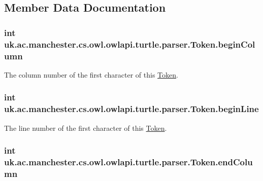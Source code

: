 \subsection{Member Data Documentation}
\hypertarget{classuk_1_1ac_1_1manchester_1_1cs_1_1owl_1_1owlapi_1_1turtle_1_1parser_1_1_token_a204c257e89ce0412166df94a2e59f745}{
\subsubsection[{begin\-Column}]{\setlength{\rightskip}{0pt plus 5cm}int uk.\-ac.\-manchester.\-cs.\-owl.\-owlapi.\-turtle.\-parser.\-Token.\-begin\-Column}}\label{classuk_1_1ac_1_1manchester_1_1cs_1_1owl_1_1owlapi_1_1turtle_1_1parser_1_1_token_a204c257e89ce0412166df94a2e59f745}
The column number of the first character of this \hyperlink{classuk_1_1ac_1_1manchester_1_1cs_1_1owl_1_1owlapi_1_1turtle_1_1parser_1_1_token}{Token}. \hypertarget{classuk_1_1ac_1_1manchester_1_1cs_1_1owl_1_1owlapi_1_1turtle_1_1parser_1_1_token_af16d327ad8503c6ab73523d31053f24e}{
\subsubsection[{begin\-Line}]{\setlength{\rightskip}{0pt plus 5cm}int uk.\-ac.\-manchester.\-cs.\-owl.\-owlapi.\-turtle.\-parser.\-Token.\-begin\-Line}}\label{classuk_1_1ac_1_1manchester_1_1cs_1_1owl_1_1owlapi_1_1turtle_1_1parser_1_1_token_af16d327ad8503c6ab73523d31053f24e}
The line number of the first character of this \hyperlink{classuk_1_1ac_1_1manchester_1_1cs_1_1owl_1_1owlapi_1_1turtle_1_1parser_1_1_token}{Token}. \hypertarget{classuk_1_1ac_1_1manchester_1_1cs_1_1owl_1_1owlapi_1_1turtle_1_1parser_1_1_token_a4616a641c63f0c68e75360d88b08faaf}{
\subsubsection[{end\-Column}]{\setlength{\rightskip}{0pt plus 5cm}int uk.\-ac.\-manchester.\-cs.\-owl.\-owlapi.\-turtle.\-parser.\-Token.\-end\-Column}}\label{classuk_1_1ac_1_1manchester_1_1cs_1_1owl_1_1owlapi_1_1turtle_1_1parser_1_1_token_a4616a641c63f0c68e75360d88b08faaf}
